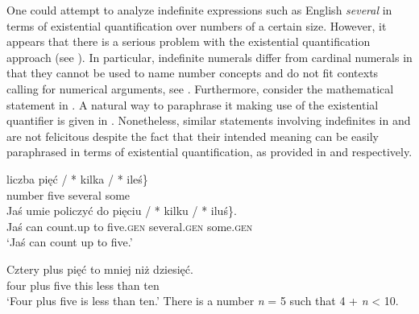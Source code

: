 \documentclass[output=paper,
]{langscibook}
\begin{document}
	One could attempt to analyze indefinite expressions such as English \textit{several} in terms of existential quantification over numbers of a certain size. However, it appears that there is a serious problem with the existential quantification approach (see \citealt{schwarzschild2002grammar}). In particular, indefinite numerals differ from cardinal numerals in that they cannot be used to name number concepts and do not fit contexts calling for numerical arguments, see . Furthermore, consider the mathematical statement in . A natural way to paraphrase it making use of the existential quantifier is given in . Nonetheless, similar statements involving indefinites in  and  are not felicitous despite the fact that their intended meaning can be easily paraphrased in terms of existential quantification, as provided in  and  respectively.
	
	\ea \label{ex:numerical-arguments} \ea \gll liczba \minsp{\{} pięć / *\hspace{-2pt} kilka / *\hspace{-2pt} {ileś\}}\label{ex:numerical-arguments-naming-numbers}\\
	number {} five {} {} several {} {} some\\
	\ex \gll Jaś umie policzyć do \minsp{\{} pięciu / *\hspace{-2pt} kilku / *\hspace{-2pt} {iluś\}}.\label{ex:numerical-arguments-context}\\
	Jaś can count.up to {} five.\textsc{gen} {} {} several.\textsc{gen} {} {} some.\textsc{gen}\\
	\glt `Jaś can count up to five.'
	\z
    \z

	\ea \label{ex:numerical-contexts-math} \ea \gll Cztery plus pięć to mniej niż dziesięć.\label{ex:numerical-contexts-math-cardinal}\\
	four plus five this less than ten\\
	\glt `Four plus five is less than ten.'
	\ex There is a number \textit{n} = 5 such that 4 + \textit{n} < 10.\label{ex:numerical-contexts-math-cardinal-paraphrase}
	\z
    \z
\end{document}
